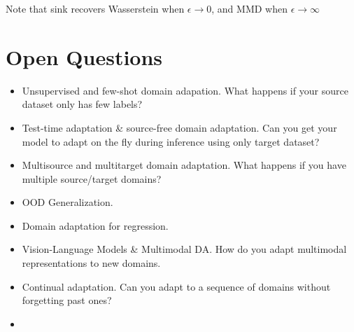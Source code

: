 Note that sink recovers Wasserstein when $\epsilon \to 0$, and MMD when $\epsilon \to \infty$

\section{Open Questions}
\begin{itemize}
	\item Unsupervised and few-shot domain adapation. What happens if your source dataset only has few labels?
	\item Test-time adaptation \& source-free domain adaptation. Can you get your model to adapt on the fly during inference using only target dataset?
	\item Multisource and multitarget domain adaptation. What happens if you have multiple source/target domains?
	\item OOD Generalization. 
	\item Domain adaptation for regression.
	\item Vision-Language Models \& Multimodal DA. How do you adapt multimodal representations to new domains.
	\item Continual adaptation. Can you adapt to a sequence of domains without forgetting past ones? 
	\item 
\end{itemize}














